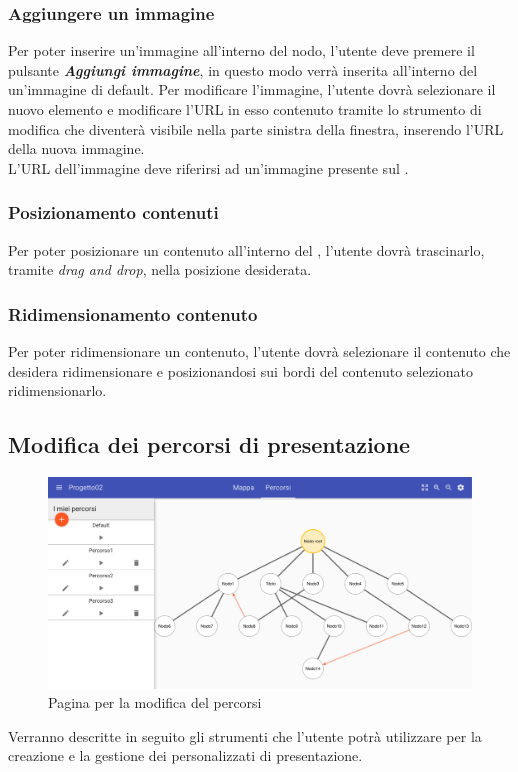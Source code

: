 \subsubsection{Aggiungere un immagine}
Per poter inserire un'immagine all'interno del nodo, l'utente deve premere il pulsante \textbf{\textit{Aggiungi immagine}}, in questo modo verrà inserita all'interno del  un'immagine di default.
Per modificare l'immagine, l'utente dovrà selezionare il nuovo elemento e modificare l'URL in esso contenuto tramite lo strumento di modifica che diventerà visibile nella parte sinistra della finestra, inserendo l'URL della nuova immagine.\\
L'URL dell'immagine deve riferirsi ad un'immagine presente sul \textbf{}.
\subsubsection{Posizionamento contenuti}
Per poter posizionare un contenuto all'interno del , l'utente dovrà trascinarlo, tramite \textit{drag and drop}, nella posizione desiderata.
\subsubsection{Ridimensionamento contenuto}
Per poter ridimensionare un contenuto, l'utente dovrà selezionare il contenuto che desidera ridimensionare e posizionandosi sui bordi del contenuto selezionato ridimensionarlo.
\subsection{Modifica dei percorsi di presentazione}
\begin{figure}[H]
\centering
\includegraphics[scale=0.3]{immagini/modificaPercorsi.pdf}
\caption{Pagina per la modifica del percorsi}
\end{figure}
\FloatBarrier
Verranno descritte in seguito gli strumenti che l'utente potrà utilizzare per la creazione e la gestione dei  personalizzati di presentazione.
